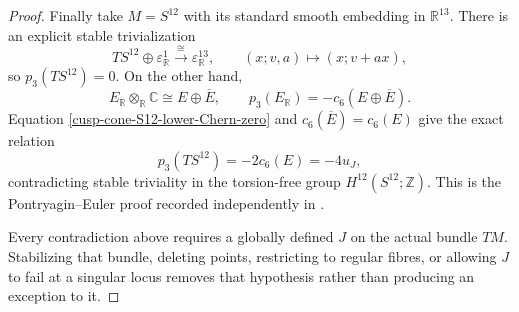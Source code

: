 \begin{proof}
Finally take \(M=S^{12}\) with its standard smooth embedding in
\(\mathbb R^{13}\).  There is an explicit stable trivialization
\begin{equation}
 TS^{12}\oplus\varepsilon^1_{\mathbb R}
 \xrightarrow{\ \cong\ }\varepsilon^{13}_{\mathbb R},
 \qquad (x;v,a)\longmapsto(x;v+ax),
 \label{cusp-cone-S12-stable-trivialization}
\end{equation}
so \(p_3(TS^{12})=0\).  On the other hand,
\[
 E_{\mathbb R}\otimes_{\mathbb R}\mathbb C
 \cong E\oplus\overline E,
 \qquad
 p_3(E_{\mathbb R})=-c_6(E\oplus\overline E).
\]
Equation \cref{cusp-cone-S12-lower-Chern-zero} and
\(c_6(\overline E)=c_6(E)\) give the exact relation
\begin{equation}
 p_3(TS^{12})=-2c_6(E)=-4u_J,
 \label{cusp-cone-S12-Pontryagin-contradiction}
\end{equation}
contradicting stable triviality in the torsion-free group
\(H^{12}(S^{12};\mathbb Z)\).  This is the Pontryagin--Euler proof recorded
independently in
\cite[Lemma~4.1 and Theorem~4.2]{KonstantisParton2018}.

Every contradiction above requires a globally defined \(J\) on the actual
bundle \(TM\).  Stabilizing that bundle, deleting points, restricting to
regular fibres, or allowing \(J\) to fail at a singular locus removes that
hypothesis rather than producing an exception to it.
\end{proof}

